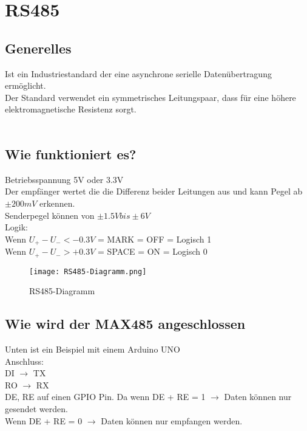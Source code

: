 \newpage
\section{RS485}
    \subsection{Generelles}
        Ist ein Industriestandard der eine asynchrone serielle Datenübertragung ermöglicht. \\
        Der Standard verwendet ein symmetrisches Leitungspaar, dass für eine höhere elektromagnetische Resistenz sorgt.\\\\

    \subsection{Wie funktioniert es?}
        Betriebsspannung 5V oder 3.3V\\
        Der empfänger wertet die die Differenz beider Leitungen aus und kann Pegel ab $\pm 200mV$ erkennen.\\
        Senderpegel können von $\pm 1.5V bis \pm 6V$\\
        Logik: \\
        Wenn $U_{+} - U_{-} < -0.3V$ = MARK = OFF = Logisch 1\\
        Wenn $U_{+} - U_{-} > +0.3V$ = SPACE = ON = Logisch 0 \\


        \begin{figure}[!htb]
            \centering
            \texttt{[image: RS485-Diagramm.png]}
            \caption{RS485-Diagramm}
            \label{caption:RS485-Diagramm}
        \end{figure}
        

\newpage
    \subsection{Wie wird der MAX485 angeschlossen}
        
        Unten ist ein Beispiel mit einem Arduino UNO\\
        Anschluss:\\
        DI $\rightarrow$ TX\\
        RO $\rightarrow$ RX\\
        DE, RE auf einen GPIO Pin. Da wenn DE + RE = 1 $\rightarrow$ Daten können nur gesendet werden.\\
        Wenn DE + RE = 0 $\rightarrow$ Daten können nur empfangen werden.\\\\
    

